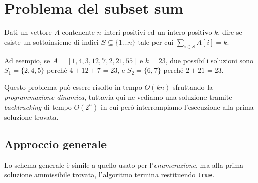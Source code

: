 \section{Problema del subset sum}
\begin{problem}
    Dati un vettore $A$ contenente $n$ interi positivi ed un intero positivo
    $k$, dire se esiste un sottoinsieme di indici $S\subseteq\{1\dots n\}$ tale
    per cui $\sum_{i\in S}A[i]=k$.
\end{problem}

\noindent
Ad esempio, se $A=[1,4,3,12,7,2,21,55]$ e $k=23$, due possibili soluzioni sono
$S_1=\{2,4,5\}$ perché $4+12+7=23$, e $S_2=\{6,7\}$ perché $2+21=23$.

\begin{note}
    Questo problema può essere risolto in tempo $O(kn)$ sfruttando la
    \emph{programmazione dinamica}, tuttavia qui ne vediamo una soluzione
    tramite \emph{backtracking} di tempo $O(2^n)$ in cui però interrompiamo
    l'esecuzione alla prima soluzione trovata.
\end{note}

\subsection{Approccio generale}
Lo schema generale è simile a quello usato per l'\emph{enumerazione}, ma alla
prima soluzione ammissibile trovata, l'algoritmo termina restituendo
\texttt{true}.

